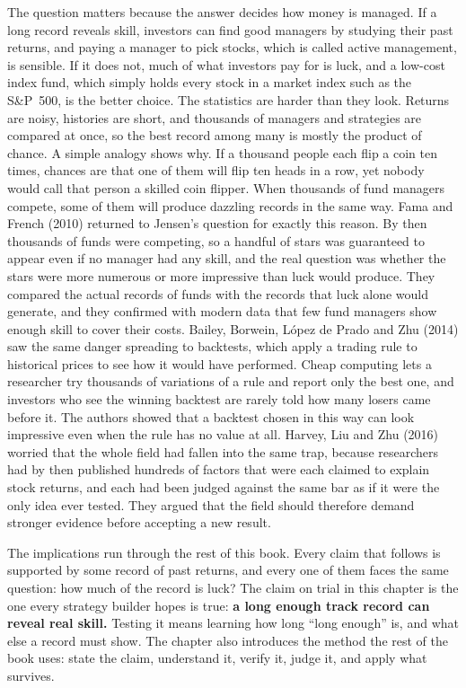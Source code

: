 The question matters because the answer decides how money is managed. If a long record reveals skill, investors can find good managers by studying their past returns, and paying a manager to pick stocks, which is called active management, is sensible. If it does not, much of what investors pay for is luck, and a low-cost index fund, which simply holds every stock in a market index such as the S\&P~500, is the better choice. The statistics are harder than they look. Returns are noisy, histories are short, and thousands of managers and strategies are compared at once, so the best record among many is mostly the product of chance. A simple analogy shows why. If a thousand people each flip a coin ten times, chances are that one of them will flip ten heads in a row, yet nobody would call that person a skilled coin flipper. When thousands of fund managers compete, some of them will produce dazzling records in the same way. Fama and French (2010) returned to Jensen's question for exactly this reason. By then thousands of funds were competing, so a handful of stars was guaranteed to appear even if no manager had any skill, and the real question was whether the stars were more numerous or more impressive than luck would produce. They compared the actual records of funds with the records that luck alone would generate, and they confirmed with modern data that few fund managers show enough skill to cover their costs. Bailey, Borwein, L\'opez de Prado and Zhu (2014) saw the same danger spreading to backtests, which apply a trading rule to historical prices to see how it would have performed. Cheap computing lets a researcher try thousands of variations of a rule and report only the best one, and investors who see the winning backtest are rarely told how many losers came before it. The authors showed that a backtest chosen in this way can look impressive even when the rule has no value at all. Harvey, Liu and Zhu (2016) worried that the whole field had fallen into the same trap, because researchers had by then published hundreds of factors that were each claimed to explain stock returns, and each had been judged against the same bar as if it were the only idea ever tested. They argued that the field should therefore demand stronger evidence before accepting a new result.

The implications run through the rest of this book. Every claim that follows is supported by some record of past returns, and every one of them faces the same question: how much of the record is luck? The claim on trial in this chapter is the one every strategy builder hopes is true: \textbf{a long enough track record can reveal real skill.} Testing it means learning how long ``long enough'' is, and what else a record must show. The chapter also introduces the method the rest of the book uses: state the claim, understand it, verify it, judge it, and apply what survives.

